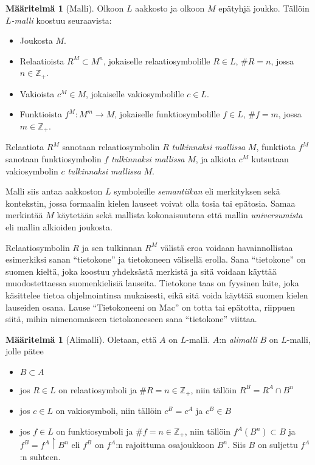 \documentclass[finnish]{tktltiki2}
\theoremstyle{definition}
\newtheorem{maar}[lau]{Määritelmä}
\theoremstyle{remark}
\begin{document}
\begin{maar}[Malli] Olkoon $L$ aakkosto ja olkoon $M$ epätyhjä joukko. Tällöin $L$\textit{-malli} koostuu seuraavista:
\begin{itemize}
\item Joukosta $M$.
\item Relaatioista $R^M \subset M^n$, jokaiselle relaatiosymbolille $R \in L$, $\#R = n$, jossa $n\in \mathbb{Z}_+$.
\item Vakioista $c^M \in M$, jokaiselle vakiosymbolille $c \in L$.
\item Funktioista $f^M: M^m \rightarrow M$, jokaiselle funktiosymbolille $f \in L$, $\#f = m$, jossa $m\in \mathbb{Z}_+$.
\end{itemize}

Relaatiota $R^M$ sanotaan relaatiosymbolin $R$ \textit{tulkinnaksi mallissa} $M$, funktiota $f^M$ sanotaan funktiosymbolin $f$ \textit{tulkinnaksi mallissa} $M$, ja alkiota $c^M$ kutsutaan vakiosymbolin $c$ \textit{tulkinnaksi mallissa} $M$.
\end{maar}

Malli siis antaa aakkoston $L$ symboleille \textit{semantiikan} eli merkityksen sekä kontekstin, jossa formaalin kielen lauseet voivat olla tosia tai epätosia. Samaa merkintää $M$ käytetään sekä mallista kokonaisuutena että mallin \textit{universumista} eli mallin alkioiden joukosta.

Relaatiosymbolin $R$ ja sen tulkinnan $R^M$ välistä eroa voidaan havainnollistaa esimerkiksi sanan ``tietokone'' ja tietokoneen välisellä erolla. Sana ``tietokone'' on suomen kieltä, joka koostuu yhdeksästä merkistä ja sitä voidaan käyttää muodostettaessa suomenkielisiä lauseita. Tietokone taas on fyysinen laite, joka käsittelee tietoa ohjelmointinsa mukaisesti, eikä sitä voida käyttää suomen kielen lauseiden osana. Lause ``Tietokoneeni on Mac'' on totta tai epätotta, riippuen siitä, mihin nimenomaiseen tietokoneeseen sana ``tietokone'' viittaa.

\begin{maar}[Alimalli]
Oletaan, että $A$ on $L$-malli. $A$:n \textit{alimalli} $B$ on $L$-malli, jolle pätee
\begin{itemize}
\item $B \subset A$
\item jos $R \in L$ on relaatiosymboli ja $\#R = n \in \mathbb{Z}_+$, niin tällöin $R^B = R^A \cap B^n$
\item jos $c \in L$ on vakiosymboli, niin tällöin $c^B = c^A$ ja $c^B \in B$
\item jos $f \in L$ on funktiosymboli ja $\#f = n \in \mathbb{Z}_+$, niin tällöin $f^A(B^n) \subset B$ ja $f^B = f^A \restriction B^n$ eli $f^B$ on $f^A$:n rajoittuma osajoukkoon $B^n$. Siis $B$ on suljettu $f^A$:n suhteen.
\end{itemize}
\end{maar}
\end{document}
